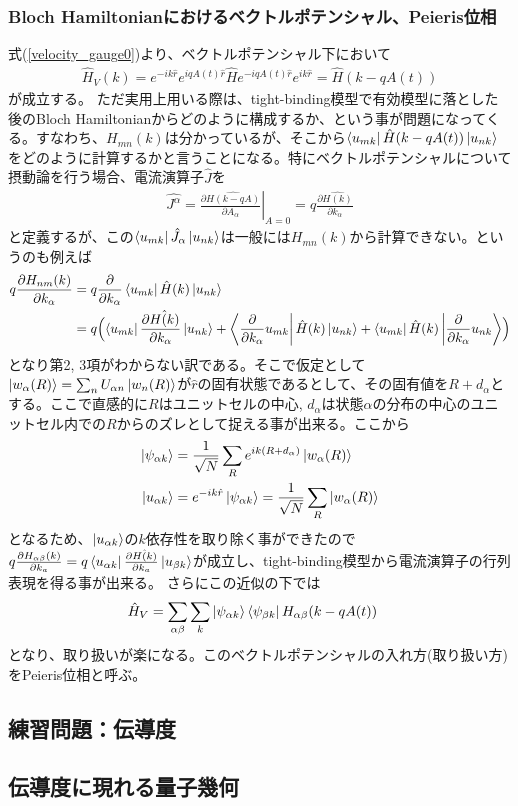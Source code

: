 \documentclass[a4paper,12pt]{jsarticle}
\newcommand{\p}{\partial}
\begin{document}
\subsubsection{Bloch Hamiltonianにおけるベクトルポテンシャル、Peieris位相}
式(\ref{velocity_gauge0})より、ベクトルポテンシャル下において
\begin{align}
  \hat{H}_V(k) = e^{-ik\hat{r}}e^{iqA(t)\hat{r}}\hat{H}e^{-iqA(t)\hat{r}}e^{ik\hat{r}} = \hat{H}(k-qA(t))
\end{align}
が成立する。
ただ実用上用いる際は、tight-binding模型で有効模型に落とした後のBloch Hamiltonianからどのように構成するか、という事が問題になってくる。すなわち、$H_{mn}(k)$は分かっているが、そこから$\bra{u_{mk}}\hat{H}(k-qA(t))\ket{u_{nk}}$をどのように計算するかと言うことになる。特にベクトルポテンシャルについて摂動論を行う場合、電流演算子$\hat{J}$を
\begin{align}
  \hat{J^{\alpha}} = \left.\frac{\p \hat{H(k-qA)}}{\p A_\alpha}\right|_{A=0} = q\frac{\p \hat{H(k)}}{\p k_\alpha} 
\end{align}
と定義するが、この$\bra{u_{mk}}\hat{J}_{\alpha}\ket{u_{nk}}$は一般には$H_{mn}(k)$から計算できない。というのも例えば
\begin{align}
  q\frac{\p H_{nm}(k)}{\p k_\alpha} &=   q\frac{\p}{\p k_\alpha}\bra{u_{mk}}\hat{H}(k)\ket{u_{nk}}\\
  &= q\Bigl(\bra{u_{mk}}\frac{\p \hat{H(k)}}{\p k_\alpha}\ket{u_{nk}} + \bra{\frac{\p}{\p k_\alpha}u_{mk}}\hat{H}(k)\ket{u_{nk}}+ \bra{u_{mk}}\hat{H}(k)\ket{\frac{\p}{\p k_\alpha}u_{nk}}\Bigr)
\end{align}
となり第2, 3項がわからない訳である。そこで仮定として$\ket{w_{\alpha}(R)} = \sum_nU_{\alpha n}\ket{w_n(R)}$が$\hat{r}$の固有状態であるとして、その固有値を$R+d_\alpha$とする。ここで直感的に$R$はユニットセルの中心, $d_\alpha$は状態$\alpha$の分布の中心のユニットセル内での$R$からのズレとして捉える事が出来る。ここから
\begin{align}
  \ket{\psi_{\alpha k}} &= \frac{1}{\sqrt{N}}\sum_{R}e^{ik(R+d_{\alpha})}\ket{w_\alpha(R)}\\
  \ket{u_{\alpha k}} &= e^{-ik\hat{r}}\ket{\psi_{\alpha k}} = \frac{1}{\sqrt{N}}\sum_{R}\ket{w_\alpha(R)}
\end{align}
となるため、$\ket{u_{\alpha k}}$の$k$依存性を取り除く事ができたので$q\frac{\p H_{\alpha\beta}(k)}{\p k_a} = q\bra{u_{\alpha k}}\frac{\p \hat{H(k)}}{\p k_a}\ket{u_{\beta k}}$が成立し、tight-binding模型から電流演算子の行列表現を得る事が出来る。
さらにこの近似の下では
\begin{align}
  \hat{H}_V & = \sum_{\alpha\beta}\sum_{k}\ket{\psi_{\alpha k}}\bra{\psi_{\beta k}} H_{\alpha\beta}(k-qA(t))
\end{align}
となり、取り扱いが楽になる。このベクトルポテンシャルの入れ方(取り扱い方)をPeieris位相と呼ぶ。

\subsection{練習問題：伝導度}

\subsection{伝導度に現れる量子幾何}
\end{document}

